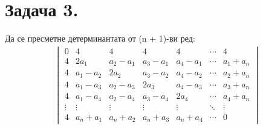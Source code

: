 \documentclass[a4paper, 12pt, oneside]{article}
\begin{document}
\section*{Задача 3.}
Да се пресметне детерминантата от (n + 1)-ви ред:
\begin{align*}
\begin{vmatrix}
    0 & 4 & 4 & 4 & 4 & \cdots & 4 \\
    4 & 2a_1 & a_2 - a_1 & a_3 - a_1 & a_4 - a_1 & \cdots & a_1 + a_n \\
    4 & a_1 - a_2 & 2a_2 & a_3 - a_2 & a_4 - a_2 & \cdots & a_2 + a_n \\
    4 & a_1 - a_3 & a_2 - a_3 & 2a_3 & a_4 - a_3 & \cdots & a_3 + a_n \\
    4 & a_1 - a_4 & a_2 - a_4 & a_3 - a_4 & 2a_4 & \cdots & a_4 + a_n \\
    \vdots & \vdots & \vdots & \vdots & \vdots & \ddots & \vdots \\
    4 & a_n + a_1 & a_n + a_2 & a_n + a_3 & a_n + a_4 & \cdots & 0
\end{vmatrix}
\end{align*}
\end{document}
